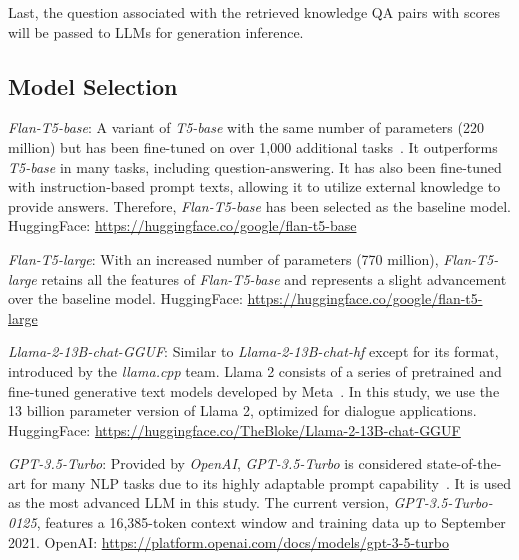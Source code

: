 Last, the question associated with the retrieved knowledge QA pairs with scores will be passed to LLMs for generation inference.

\subsection{Model Selection}

\emph{Flan-T5-base}: A variant of \emph{T5-base} with the same number of parameters (220 million) but has been fine-tuned on over 1,000 additional tasks~\citep{https://doi.org/10.48550/arxiv.2210.11416}. It outperforms \emph{T5-base} in many tasks, including question-answering. It has also been fine-tuned with instruction-based prompt texts, allowing it to utilize external knowledge to provide answers. Therefore, \emph{Flan-T5-base} has been selected as the baseline model. HuggingFace: \url{https://huggingface.co/google/flan-t5-base}

\vspace{0.3\baselineskip}

\noindent\emph{Flan-T5-large}: With an increased number of parameters (770 million), \emph{Flan-T5-large} retains all the features of \emph{Flan-T5-base} and represents a slight advancement over the baseline model.
HuggingFace: \url{https://huggingface.co/google/flan-t5-large} 

\vspace{0.3\baselineskip}

\noindent\emph{Llama-2-13B-chat-GGUF}: Similar to \emph{Llama-2-13B-chat-hf} except for its format, introduced by the \emph{llama.cpp} team. Llama 2 consists of a series of pretrained and fine-tuned generative text models developed by Meta~\citep{touvron2023llama}. In this study, we use the 13 billion parameter version of Llama 2, optimized for dialogue applications.
HuggingFace: \url{https://huggingface.co/TheBloke/Llama-2-13B-chat-GGUF} 

\vspace{0.3\baselineskip}

\noindent\emph{GPT-3.5-Turbo}: Provided by \emph{OpenAI}, \emph{GPT-3.5-Turbo} is considered state-of-the-art for many NLP tasks due to its highly adaptable prompt capability~\citep{brown2020language}. It is used as the most advanced LLM in this study. The current version, \emph{GPT-3.5-Turbo-0125}, features a 16,385-token context window and training data up to September 2021.
OpenAI: \url{https://platform.openai.com/docs/models/gpt-3-5-turbo}

